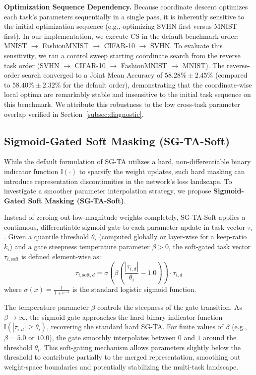\textbf{Optimization Sequence Dependency.}
Because coordinate descent optimizes each task's parameters sequentially in a single pass, it is inherently sensitive to the initial optimization sequence (e.g., optimizing SVHN first versus MNIST first). In our implementation, we execute CS in the default benchmark order: MNIST $\rightarrow$ FashionMNIST $\rightarrow$ CIFAR-10 $\rightarrow$ SVHN. To evaluate this sensitivity, we ran a control sweep starting coordinate search from the reverse task order (SVHN $\rightarrow$ CIFAR-10 $\rightarrow$ FashionMNIST $\rightarrow$ MNIST). The reverse-order search converged to a Joint Mean Accuracy of $58.28\% \pm 2.45\%$ (compared to $58.40\% \pm 2.32\%$ for the default order), demonstrating that the coordinate-wise local optima are remarkably stable and insensitive to the initial task sequence on this benchmark. We attribute this robustness to the low cross-task parameter overlap verified in Section~\ref{subsec:diagnostic}.

\subsection{Sigmoid-Gated Soft Masking (SG-TA-Soft)}
\label{sub:soft_masking}
While the default formulation of SG-TA utilizes a hard, non-differentiable binary indicator function $\mathbb{I}(\cdot)$ to sparsify the weight updates, such hard masking can introduce representation discontinuities in the network's loss landscape. To investigate a smoother parameter interpolation strategy, we propose \textbf{Sigmoid-Gated Soft Masking (SG-TA-Soft)}.

Instead of zeroing out low-magnitude weights completely, SG-TA-Soft applies a continuous, differentiable sigmoid gate to each parameter update in task vector $\tau_i$. Given a quantile threshold $\theta_i$ (computed globally or layer-wise for a keep-ratio $k_i$) and a gate steepness temperature parameter $\beta > 0$, the soft-gated task vector $\tau_{i, \text{soft}}$ is defined element-wise as:
\begin{equation}
\tau_{i, \text{soft}, d} = \sigma \left( \beta \left( \frac{|\tau_{i, d}|}{\theta_i} - 1.0 \right) \right) \cdot \tau_{i, d}
\end{equation}
where $\sigma(x) = \frac{1}{1 + e^{-x}}$ is the standard logistic sigmoid function. 

The temperature parameter $\beta$ controls the steepness of the gate transition. As $\beta \rightarrow \infty$, the sigmoid gate approaches the hard binary indicator function $\mathbb{I}(|\tau_{i, d}| \ge \theta_i)$, recovering the standard hard SG-TA. For finite values of $\beta$ (e.g., $\beta = 5.0$ or $10.0$), the gate smoothly interpolates between $0$ and $1$ around the threshold $\theta_i$. This soft-gating mechanism allows parameters slightly below the threshold to contribute partially to the merged representation, smoothing out weight-space boundaries and potentially stabilizing the multi-task landscape.
